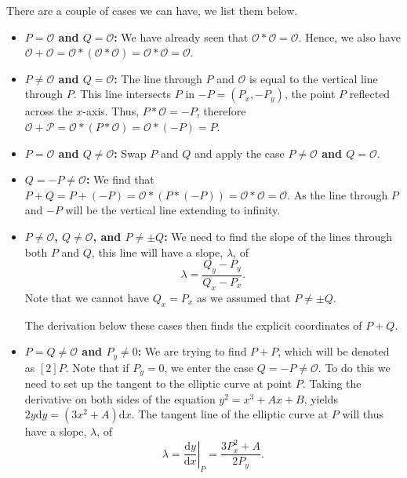 \documentclass[openany, a4paper, 10pt]{book}
\theoremstyle{plain}
\theoremstyle{plain}
\theoremstyle{plain}
\theoremstyle{definition}
\theoremstyle{plain}
\theoremstyle{definition}
\theoremstyle{remark}
\begin{document}
There are a couple of cases we can have, we list them below.
\begin{itemize}
    \item[--] \textbf{$P=\mathcal O$ and $Q=\mathcal O$:}
        We have already seen that
        $\mathcal O * \mathcal O = \mathcal O$.
        Hence, we also have
        $\mathcal O + \mathcal O = \mathcal O * (\mathcal O * \mathcal O) = \mathcal O * \mathcal O = \mathcal O$.
    \item[--] \textbf{$P\neq\mathcal O$ and $Q=\mathcal O$:}
        The line through $P$ and $\mathcal O$ is equal to the vertical line through $P$.
        This line intersects $P$ in $-P=(P_x, -P_y)$, the point $P$ reflected across the $x$-axis.
        Thus, $P * \mathcal O = -P$, therefore $\mathcal O + \mathcal P = \mathcal O * (P * \mathcal O) = \mathcal O * (-P) = P$.
    \item[--] \textbf{$P=\mathcal O$ and $Q\neq\mathcal O$:}
        Swap $P$ and $Q$ and apply the case \textbf{$P\neq\mathcal O$ and $Q=\mathcal O$}.
    \item[--] \textbf{$Q = -P\neq\mathcal O$:}
        We find that $P + Q = P + (-P) = \mathcal O * (P * (-P)) = \mathcal O * \mathcal O = \mathcal O$.
        As the line through $P$ and $-P$ will be the vertical line extending to infinity.
    \item[--] \textbf{$P\neq\mathcal O$, $Q\neq\mathcal O$, and $P \neq \pm Q$:}
        We need to find the slope of the lines through
        both $P$ and $Q$, this line will have a slope, $\lambda$, of
        \begin{equation*}
            \lambda = \frac{Q_y-P_y}{Q_x-P_x}.
        \end{equation*}
        Note that we cannot have $Q_x = P_x$ as we assumed that $P\neq \pm Q$.

        The derivation below these cases then finds the explicit coordinates of $P+Q$.
    \item[--] \textbf{$P=Q\neq\mathcal O$ and $P_y \neq 0$:}
        We are trying to find $P+P$, which will be denoted as $[2]P$.
        Note that if $P_y=0$, we enter the case $Q=-P \neq \mathcal O$.
        To do this we need to set up the tangent to the elliptic curve at point $P$.
        Taking the derivative on both sides of the equation $y^2=x^3+Ax+B$, yields $2y\mathrm dy = (3x^2+A)\mathrm dx$.
        The tangent line of the elliptic curve at $P$ will thus have a slope, $\lambda$, of
        \begin{equation*}
            \lambda =
            \left. \frac{\mathrm dy}{\mathrm dx} \right|_{P} =
            \frac{3P_x^2 + A}{2P_y}.
        \end{equation*}
\end{itemize}
\end{document}
